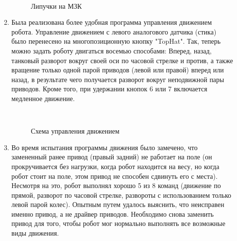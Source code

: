 \begin{enumerate}
\begin{enumerate}
\begin{figure}[H]
\begin{minipage}[h]{0.29\linewidth}
			\end{minipage}
			\hfill
			\begin{minipage}[h]{0.1\linewidth}
				\center  
			\end{minipage}
			\caption{Липучки на МЗК}
		\end{figure}
		
        \item Была реализована более удобная программа управления движением робота. Управление движением с левого аналогового датчика (стика) было перенесено на многопозиционную кнопку "TopHat". Так, теперь можно задать роботу двигаться восемью способами: Вперед, назад, танковый разворот вокруг своей оси по часовой стрелке и против, а также вращение только одной парой приводов (левой или правой) вперед или назад, в результате чего получается разворот вокруг неподвижной пары приводов. Кроме того, при удержании кнопок 6 или 7 включается медленное движение.
		
        \begin{figure}[H]
	  	  \begin{minipage}[h]{0.2\linewidth}
	  		\center  
	  	  \end{minipage}
	  	  \begin{minipage}[h]{0.6\linewidth}
	  		\caption{Схема управления движением}
	  	  \end{minipage}
	   \end{figure}
	   
	   \item Во время испытания программы движения было замечено, что замененный ранее привод (правый задний) не работает на поле (он прокручивается без нагрузки, когда робот находится на весу, но когда робот стоит на поле, этом привод не способен сдвинуть его с места). Несмотря на это, робот выполнял хорошо 5 из 8 команд (движение по прямой, разворот по часовой стрелке, развороты с использованием только левой парой колес). Опытным путем удалось выяснить, что неисправен именно привод, а не драйвер приводов. Необходимо снова заменить привод для того, чтобы робот мог нормально выполнять все возможные виды движения.
	   

\end{enumerate}
\end{enumerate}
